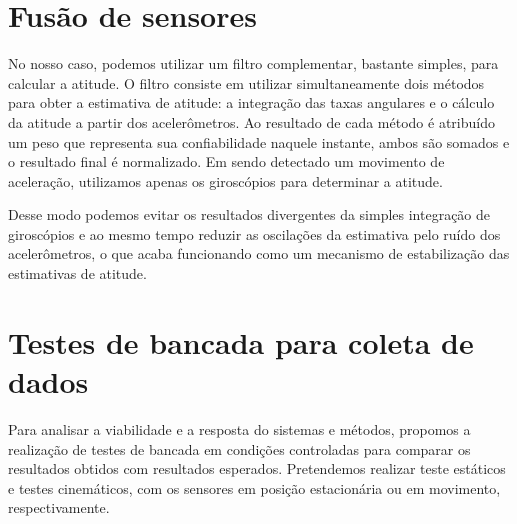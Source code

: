 \section{Fusão de sensores}

No nosso caso, podemos utilizar um filtro complementar, bastante simples, para calcular a atitude. O filtro consiste em utilizar simultaneamente dois métodos para obter a estimativa de atitude: a integração das taxas angulares e o cálculo da atitude a partir dos acelerômetros. Ao resultado de cada método é atribuído um peso que representa sua confiabilidade naquele instante, ambos são somados e o resultado final é normalizado. Em sendo detectado um movimento de aceleração, utilizamos apenas os giroscópios para determinar a atitude.

Desse modo podemos evitar os resultados divergentes da simples integração de giroscópios e ao mesmo tempo reduzir as oscilações da estimativa pelo ruído dos acelerômetros, o que acaba funcionando como um mecanismo de estabilização das estimativas de atitude.

\section{Testes de bancada para coleta de dados}

Para analisar a viabilidade e a resposta do sistemas e métodos, propomos a realização de testes de bancada em condições controladas para comparar os resultados obtidos com resultados esperados. Pretendemos realizar teste estáticos e testes cinemáticos, com os sensores em posição estacionária ou em movimento, respectivamente.
